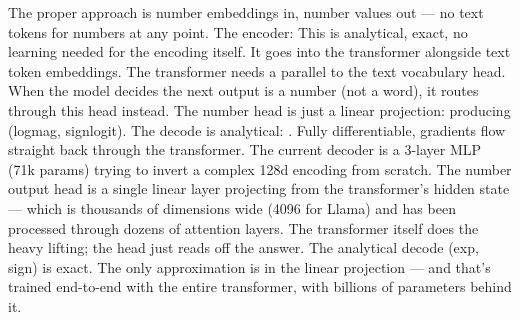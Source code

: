 {}
\markdownRendererSectionEnd \markdownRendererSectionBegin
{}\markdownRendererInterblockSeparator
{}The proper approach is number embeddings in, number values out — no text tokens for numbers at any point.\markdownRendererInterblockSeparator
{}\markdownRendererSectionBegin
{}\markdownRendererInterblockSeparator
{}The encoder: \markdownRendererParagraphSeparator
{}This is analytical, exact, no learning needed for the encoding itself. It goes into the transformer alongside text token embeddings.\markdownRendererInterblockSeparator
{}
\markdownRendererSectionEnd \markdownRendererSectionBegin
{}\markdownRendererInterblockSeparator
{}The transformer needs a  parallel to the text vocabulary head. When the model decides the next output is a number (not a word), it routes through this head instead.\markdownRendererParagraphSeparator
{}\markdownRendererInterblockSeparator
{}\markdownRendererInterblockSeparator
{}The number head is just a linear projection:  producing (log\markdownRendererUnderscore{}mag, sign\markdownRendererUnderscore{}logit). The decode is analytical: . Fully differentiable, gradients flow straight back through the transformer.\markdownRendererParagraphSeparator
{}\markdownRendererParagraphSeparator
{}The current decoder is a 3-layer MLP (71k params) trying to invert a complex 128d encoding from scratch. The number output head is a single linear layer projecting from the transformer's hidden state — which is thousands of dimensions wide (4096 for Llama) and has been processed through dozens of attention layers. The transformer itself does the heavy lifting; the head just reads off the answer.\markdownRendererParagraphSeparator
{}The analytical decode (exp, sign) is exact. The only approximation is in the linear projection — and that's trained end-to-end with the entire transformer, with billions of parameters behind it.\markdownRendererInterblockSeparator
